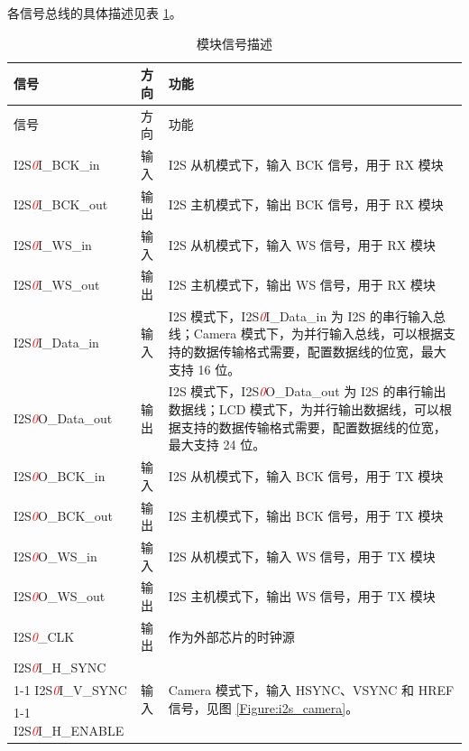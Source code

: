 \documentclass[main\_\_CN.tex]{subfiles}
\begin{document}
各信号总线的具体描述见表 \ref{table:I2S 信号总线描述}。


\begin{longtable}{|p{3cm}|p{2cm}|p{10cm}|}
\caption{模块信号描述} \label{table:I2S 信号总线描述} \\
\hline
\rowcolor{lightgray}
信号 & 方向 & 功能 \\
\hline
\endfirsthead

\hline
\rowcolor{lightgray}
信号 & 方向 & 功能 \\
\hline
\endhead

I2S\textcolor{red}{\it{0}}I\_BCK\_in & 输入 & I2S 从机模式下，输入 BCK 信号，用于 RX 模块 \\
\hline
I2S\textcolor{red}{\it{0}}I\_BCK\_out & 输出 & I2S 主机模式下，输出 BCK 信号，用于 RX 模块 \\
\hline
I2S\textcolor{red}{\it{0}}I\_WS\_in & 输入 & I2S 从机模式下，输入 WS 信号，用于 RX 模块 \\
\hline
I2S\textcolor{red}{\it{0}}I\_WS\_out & 输出 & I2S 主机模式下，输出 WS 信号，用于 RX 模块 \\
\hline
\vspace{0.6em}I2S\textcolor{red}{\it{0}}I\_Data\_in & \vspace{0.6em}输入 & I2S 模式下，I2S\textcolor{red}{\it{0}}I\_Data\_in 为 I2S 的串行输入总线；Camera 模式下，为并行输入总线，可以根据支持的数据传输格式需要，配置数据线的位宽，最大支持 16 位。 \\
\hline
\vspace{0.6em}I2S\textcolor{red}{\it{0}}O\_Data\_out & \vspace{0.6em}输出 & I2S 模式下，I2S\textcolor{red}{\it{0}}O\_Data\_out 为 I2S 的串行输出数据线；LCD 模式下，为并行输出数据线，可以根据支持的数据传输格式需要，配置数据线的位宽，最大支持 24 位。 \\
\hline
I2S\textcolor{red}{\it{0}}O\_BCK\_in & 输入 & I2S 从机模式下，输入 BCK 信号，用于 TX 模块 \\
\hline
I2S\textcolor{red}{\it{0}}O\_BCK\_out & 输出 & I2S 主机模式下，输出 BCK 信号，用于 TX 模块 \\
\hline
I2S\textcolor{red}{\it{0}}O\_WS\_in & 输入 & I2S 从机模式下，输入 WS 信号，用于 TX 模块 \\
\hline
I2S\textcolor{red}{\it{0}}O\_WS\_out & 输出 & I2S 主机模式下，输出 WS 信号，用于 TX 模块 \\
\hline
I2S\textcolor{red}{\it{0}}\_CLK & 输出 & 作为外部芯片的时钟源 \\
\hline
I2S\textcolor{red}{\it{0}}I\_H\_SYNC & \multirow{3}{*}{输入} & \multirow{3}{=}{Camera 模式下，输入 HSYNC、VSYNC 和 HREF 信号，见图 \ref{Figure:i2s_camera}。} \\
\cline{1-1}
I2S\textcolor{red}{\it{0}}I\_V\_SYNC & & \\
\cline{1-1}
I2S\textcolor{red}{\it{0}}I\_H\_ENABLE & & \\
\hline
\end{longtable}
\end{document}
